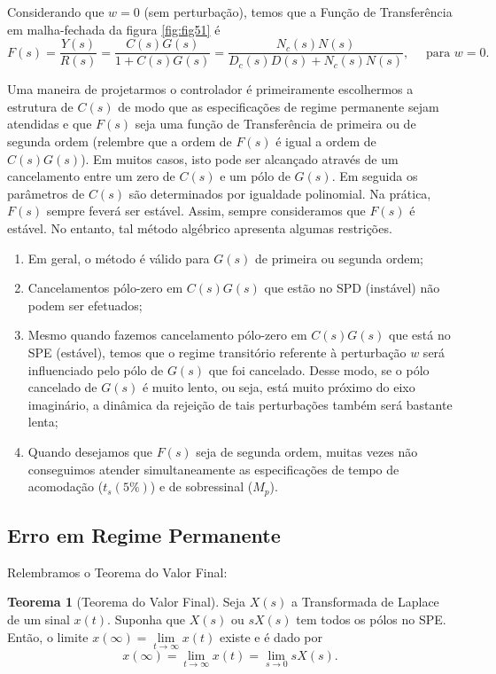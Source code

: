 \documentclass[
]{book}
\providecommand{\tightlist}{%
  \setlength{\itemsep}{0pt}\setlength{\parskip}{0pt}}
\begin{document}
Considerando que \(w=0\) (sem perturbação), temos que a Função de Transferência em malha-fechada da figura \ref{fig:fig51} é
\[
F(s) = \frac {Y(s)}{R(s)} = \frac {C(s)G(s)}{1+C(s)G(s)}= \frac {N_c(s)N(s)}{D_c(s)D(s)+N_c(s)N(s)}, \quad \text{ para } w=0.
\]

Uma maneira de projetarmos o controlador é primeiramente escolhermos a estrutura de \(C(s)\) de modo que as especificações de regime permanente sejam atendidas e que \(F(s)\) seja uma função de Transferência de primeira ou de segunda ordem (relembre que a ordem de \(F(s)\) é igual a ordem de \(C(s)G(s)\)). Em muitos casos, isto pode ser alcançado através de um cancelamento entre um zero de \(C(s)\) e um pólo de \(G(s)\). Em seguida os parâmetros de \(C(s)\) são determinados por igualdade polinomial. Na prática, \(F(s)\) sempre feverá ser estável. Assim, sempre consideramos que \(F(s)\) é estável. No entanto, tal método algébrico apresenta algumas restrições.

\begin{enumerate}
\def\labelenumi{\arabic{enumi}.}
\tightlist
\item
  Em geral, o método é válido para \(G(s)\) de primeira ou segunda ordem;
\item
  Cancelamentos pólo-zero em \(C(s)G(s)\) que estão no SPD (instável) não podem ser efetuados;
\item
  Mesmo quando fazemos cancelamento pólo-zero em \(C(s)G(s)\) que está no SPE (estável), temos que o regime transitório referente à perturbação \(w\) será influenciado pelo pólo de \(G(s)\) que foi cancelado. Desse modo, se o pólo cancelado de \(G(s)\) é muito lento, ou seja, está muito próximo do eixo imaginário, a dinâmica da rejeição de tais perturbações também será bastante lenta;
\item
  Quando desejamos que \(F(s)\) seja de segunda ordem, muitas vezes não conseguimos atender simultaneamente as especificações de tempo de acomodação (\(t_s(5\%)\)) e de sobressinal (\(M_p\)).
\end{enumerate}

\hypertarget{erro-em-regime-permanente-1}{%
\subsection{Erro em Regime Permanente}\label{erro-em-regime-permanente-1}}

Relembramos o Teorema do Valor Final:

\textbf{Teorema 1} (Teorema do Valor Final). Seja \(X(s)\) a Transformada de Laplace de um sinal \(x(t)\). Suponha que \(X(s)\) ou \(sX(s)\) tem todos os pólos no SPE. Então, o limite \(x(\infty) = \lim\limits_{t \to \infty}{x(t)}\) existe e é dado por
\[
x(\infty) = \lim\limits_{t \to \infty}{x(t)} = \lim\limits_{s \to 0}{sX(s)}.
\]
\end{document}
